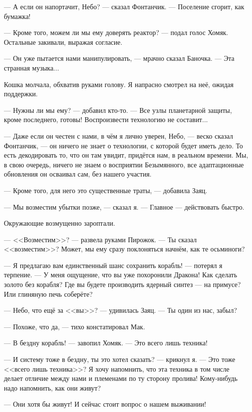 --- А если он напортачит, Небо? --- сказал Фонтанчик.
--- Поселение сгорит, как бумажка!

--- Кроме того, можем ли мы ему доверять реактор? --- подал голос Хомяк.
Остальные закивали, выражая согласие.

--- Он уже пытается нами манипулировать, --- мрачно сказал Баночка.
--- Эта странная музыка...

Кошка молчала, обхватив руками голову.
Я напрасно смотрел на неё, ожидая поддержки.

--- Нужны ли мы ему? --- добавил кто-то.
--- Все узлы планетарной защиты, кроме последнего, готовы!
Воспроизвести технологию не составит...

--- Даже если он честен с нами, в чём я лично уверен, Небо, --- веско сказал Фонтанчик, --- он ничего не знает о технологии, с которой будет иметь дело.
То есть декодировать то, что он там увидит, придётся нам, в реальном времени.
Мы, в свою очередь, ничего не знаем о восприятии Безымянного, все адаптационные обновления он осваивал сам, без нашего участия.

--- Кроме того, для него это существенные траты, --- добавила Заяц.

--- Мы возместим убытки позже, --- сказал я.
--- Главное --- действовать быстро.

Окружающие возмущенно зароптали.

---  <<Возместим>>? --- развела руками Пирожок.
--- Ты сказал <<возместим>>?
Может, мы ему сразу поклоняться начнём, как те осьминоги?

--- Я предлагаю вам единственный шанс сохранить корабль! --- потерял я терпение.
--- У меня ощущение, что вы уже похоронили Дракона!
Как сделать золото без корабля?
Где вы будете производить ядерный синтез --- на примусе?
Или глиняную печь соберёте?

--- Небо, что ещё за <<вы>>? --- удивилась Заяц.
--- Ты один из нас, забыл?

--- Похоже, что да, --- тихо констатировал Мак.

--- В бездну корабль! --- завопил Хомяк.
--- Это всего лишь техника!

--- И систему тоже в бездну, ты это хотел сказать? --- крикнул я.
--- Это тоже <<всего лишь техника>>?
Я хочу напомнить, что эта техника в том числе делает отличие между нами и племенами по ту сторону пролива!
Кому-нибудь надо напомнить, как они живут?

--- Они хотя бы живут!
И сейчас стоит вопрос о нашем выживании!

